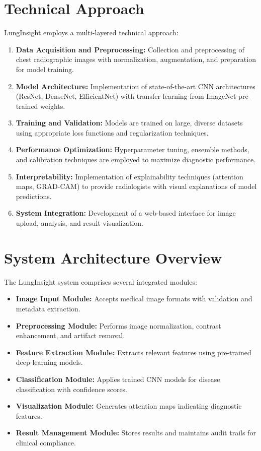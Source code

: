 {\section{Technical Approach}

LungInsight employs a multi-layered technical approach:

\begin{enumerate}
    \item \textbf{Data Acquisition and Preprocessing:} Collection and preprocessing of chest radiographic images with normalization, augmentation, and preparation for model training.
    \item \textbf{Model Architecture:} Implementation of state-of-the-art CNN architectures (ResNet, DenseNet, EfficientNet) with transfer learning from ImageNet pre-trained weights.
    \item \textbf{Training and Validation:} Models are trained on large, diverse datasets using appropriate loss functions and regularization techniques.
    \item \textbf{Performance Optimization:} Hyperparameter tuning, ensemble methods, and calibration techniques are employed to maximize diagnostic performance.
    \item \textbf{Interpretability:} Implementation of explainability techniques (attention maps, GRAD-CAM) to provide radiologists with visual explanations of model predictions.
    \item \textbf{System Integration:} Development of a web-based interface for image upload, analysis, and result visualization.
\end{enumerate}

\section{System Architecture Overview}

The LungInsight system comprises several integrated modules:

\begin{itemize}
    \item \textbf{Image Input Module:} Accepts medical image formats with validation and metadata extraction.
    \item \textbf{Preprocessing Module:} Performs image normalization, contrast enhancement, and artifact removal.
    \item \textbf{Feature Extraction Module:} Extracts relevant features using pre-trained deep learning models.
    \item \textbf{Classification Module:} Applies trained CNN models for disease classification with confidence scores.
    \item \textbf{Visualization Module:} Generates attention maps indicating diagnostic features.
    \item \textbf{Result Management Module:} Stores results and maintains audit trails for clinical compliance.
\end{itemize}

}
